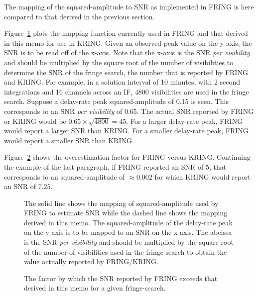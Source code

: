 The mapping of the squared-amplitude to SNR as implemented in FRING is
here compared to that derived in the previous section.

Figure~\ref{fig:FRINGtoKRING} plots the mapping function currently
used in FRING and that derived in this memo for use in KRING.  Given
an observed peak value on the y-axis, the SNR is to be read off of the
x-axis. Note that the x-axis is the SNR {\it per visibility} and
should be multiplied by the square root of the number of visibilities
to determine the SNR of the fringe search, the number that is reported
by FRING and KRING.  For example, in a solution interval of 10
minutes, with 2 second integrations and 16 channels across an IF, 4800
visibilities are used in the fringe search.  Suppose a delay-rate peak
squared-amplitude of 0.15 is seen.  This corresponds to an SNR {\em
per visibility} of 0.65.  The actual SNR reported by FRING or KRING
would be $0.65\times\sqrt{4800} = 45$.  For a larger delay-rate peak,
FRING would report a larger SNR than KRING.  For a smaller delay-rate
peak, FRING would report a smaller SNR than KRING.

Figure~\ref{fig:FRINGoverKRING} shows the overestimation factor for
FRING versus KRING.  Continuing the example of the last paragraph, if
FRING reported an SNR of $5$, that corresponds to an squared-amplitude
of $\approx 0.002$ for which KRING would report an SNR of $7.25$.

\begin{figure}
\if\doFig\figyes
   \centerline{\hss{}\hss}
\else
    \vskip 8.0in
\fi
\caption{ The solid line shows the mapping of squared-amplitude used
by FRING to estimate SNR while the dashed line shows the mapping
derived in this memo.  The squared-amplitude of the delay-rate peak on
the y-axis is to be mapped to an SNR on the x-axis.  The abcissa is
the SNR {\it per visibility} and should be multiplied by the square
root of the number of visibilities used in the fringe search to obtain
the value actually reported by FRING/KRING.}
\label{fig:FRINGtoKRING}
\end{figure}

\begin{figure}
\if\doFig\figyes
   \centerline{\hss{}\hss}
\else
    \vskip 8.0in
\fi
\caption{
The factor by which the SNR reported by FRING exceeds that derived in
this memo for a given fringe-search.}
\label{fig:FRINGoverKRING}
\end{figure}

